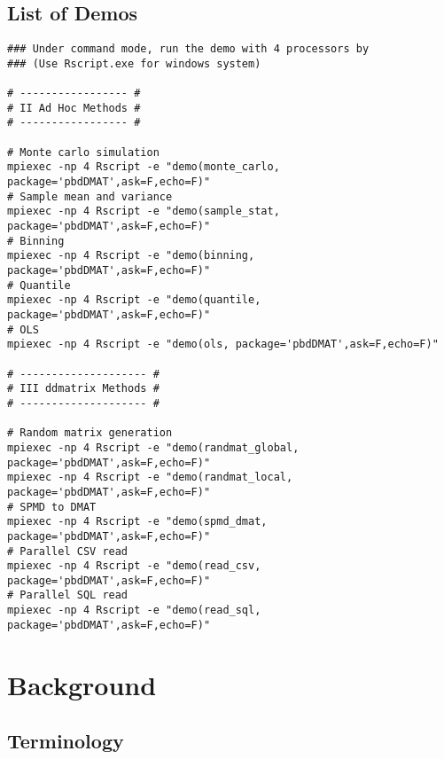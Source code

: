 \subsection{List of Demos}

\begin{lstlisting}[title=Shell Script]
### Under command mode, run the demo with 4 processors by
### (Use Rscript.exe for windows system)

# ----------------- #
# II Ad Hoc Methods #
# ----------------- #

# Monte carlo simulation
mpiexec -np 4 Rscript -e "demo(monte_carlo, package='pbdDMAT',ask=F,echo=F)"
# Sample mean and variance
mpiexec -np 4 Rscript -e "demo(sample_stat, package='pbdDMAT',ask=F,echo=F)"
# Binning
mpiexec -np 4 Rscript -e "demo(binning, package='pbdDMAT',ask=F,echo=F)"
# Quantile
mpiexec -np 4 Rscript -e "demo(quantile, package='pbdDMAT',ask=F,echo=F)"
# OLS
mpiexec -np 4 Rscript -e "demo(ols, package='pbdDMAT',ask=F,echo=F)"

# -------------------- #
# III ddmatrix Methods #
# -------------------- #

# Random matrix generation
mpiexec -np 4 Rscript -e "demo(randmat_global, package='pbdDMAT',ask=F,echo=F)"
mpiexec -np 4 Rscript -e "demo(randmat_local, package='pbdDMAT',ask=F,echo=F)"
# SPMD to DMAT
mpiexec -np 4 Rscript -e "demo(spmd_dmat, package='pbdDMAT',ask=F,echo=F)"
# Parallel CSV read
mpiexec -np 4 Rscript -e "demo(read_csv, package='pbdDMAT',ask=F,echo=F)"
# Parallel SQL read
mpiexec -np 4 Rscript -e "demo(read_sql, package='pbdDMAT',ask=F,echo=F)"
\end{lstlisting}













\section{Background}
\label{sec:bg}



\subsection{Terminology}

